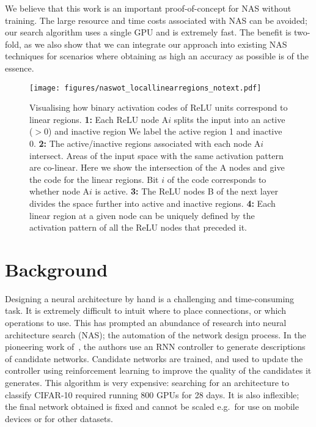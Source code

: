 \documentclass{article}
\begin{document}
We believe that this work is an important proof-of-concept for NAS without training. The large resource and time costs associated with NAS can be avoided; our search algorithm uses a single GPU and is extremely fast. The benefit is two-fold, as we also show that we can integrate our approach into existing NAS techniques for scenarios where obtaining as high an accuracy as possible is of the essence. 




\begin{figure*}[!h]
\centering

    \texttt{[image: figures/naswot\_locallinearregions\_notext.pdf]}
\caption{Visualising how binary activation codes of ReLU units correspond to linear regions.
{\bf 1:} Each ReLU node A$i$ splits the input into an active ($>0$) and inactive region We label the active region 1 and inactive 0. {\bf 2:} The active/inactive regions associated with each node A$i$ intersect. Areas of the input space with the same activation pattern are co-linear. Here we show the intersection of the A nodes and give the code for the linear regions. Bit $i$ of the code corresponds to whether node A$i$ is active. {\bf 3:} The ReLU nodes B of the next layer divides the space further into active and inactive regions. {\bf 4:} Each linear region at a given node can be uniquely defined by the activation pattern of all the ReLU nodes that preceded it.}
    \label{fig:locallinearcodes} 
\end{figure*}


\section{Background}
\label{sec:lit}

Designing a neural architecture by hand is a challenging and time-consuming task. It is extremely difficult to intuit where to place connections, or which operations to use. This has prompted an abundance of research into neural architecture search (NAS); the automation of the network design process. In the pioneering work of~\cite{zoph2017neural}, the authors use an RNN controller to generate descriptions of candidate networks. Candidate networks are trained, and used to update the controller using reinforcement learning to improve the quality of the candidates it generates. This algorithm is very expensive: searching for an architecture to classify CIFAR-10 required running 800 GPUs for 28 days. It is also inflexible; the final network obtained is fixed and cannot be scaled e.g.\ for use on mobile devices or for other datasets.
\end{document}
